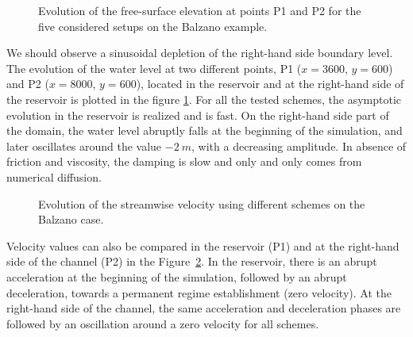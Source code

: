 \begin{figure}[H]
\begin{minipage}[t]{0.5\textwidth}
 \centering
\end{minipage}%
\begin{minipage}[t]{0.5\textwidth}
 \centering
\end{minipage}
\caption{Evolution of the free-surface elevation at points P1 and P2 for the five considered setups on the Balzano example.}
\label{fig:balzano:temporalSL}
\end{figure}

We should observe a sinusoidal depletion of the right-hand side boundary level.
The evolution of the water level at two different points, P1 ($x=3600$, $y=600$) and P2 ($x=8000$, $y=600$), located in the reservoir and at the right-hand side of the reservoir is plotted in the figure \ref{fig:balzano:temporalSL}.
For all the tested schemes, the asymptotic evolution in the reservoir is realized and is fast.
On the right-hand side part of the domain, the water level abruptly falls at the beginning of
the simulation, and later oscillates around the value $-2~m$,
with a decreasing amplitude. In absence of friction and viscosity, the damping is slow and only 
and only comes from numerical diffusion.

\begin{figure}[H]
\begin{minipage}[t]{0.5\textwidth}
 \centering
\end{minipage}%
\begin{minipage}[t]{0.5\textwidth}
 \centering
\end{minipage}
\caption{Evolution of the streamwise velocity using different schemes on the Balzano case.}
\label{fig:balzano:temporalU}
\end{figure}

Velocity values can also be compared in the reservoir (P1) and at the right-hand side of the channel (P2) in the Figure~\ref{fig:balzano:temporalU}.
In the reservoir, there is an abrupt acceleration at the beginning of the simulation, followed by an
abrupt deceleration, towards a permanent regime establishment (zero velocity).
At the right-hand side of the channel, the same acceleration and deceleration
phases are followed by an oscillation around a zero velocity for all schemes.

